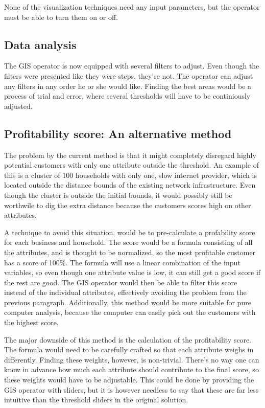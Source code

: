 \documentclass[twocolumn]{article}
\begin{document}
None of the visualization techniques need any input parameters, but the operator must be able to turn them on or off.

\subsection{Data analysis}
\label{sub:Data analysis}
The GIS operator is now equipped with several filters to adjust. Even though the filters were presented like they were steps, they're not. The operator can adjust any filters in any order he or she would like. Finding the best areas would be a process of trial and error, where several thresholds will have to be continiously adjusted.

\subsection{Profitability score: An alternative method}
\label{sub:Profitability score: An alternate method}
The problem by the current method is that it might completely disregard highly potential customers with only one attribute outside the threshold. An example of this is a cluster of 100 households with only one, slow internet provider, which is located outside the distance bounds of the existing network infrastructure. Even though the cluster is outside the initial bounds, it would possibly still be worthwile to dig the extra distance because the customers scores high on other attributes.

A technique to avoid this situation, would be to pre-calculate a profability score for each business and household. The score would be a formula consisting of all the attributes, and is thought to be normalized, so the most profitable customer has a score of 100\%. The formula will use a linear combination of the input variables, so even though one attribute value is low, it can still get a good score if the rest are good. The GIS operator would then be able to filter this score instead of the individual attributes, effectively avoiding the problem from the previous paragraph. Additionally, this method would be more suitable for pure computer analysis, because the computer can easily pick out the customers with the highest score.

The major downside of this method is the calculation of the profitability score. The formula would need to be carefully crafted so that each attribute weighs in differently. Finding these weights, however, is non-trivial. There's no way one can know in advance how much each attribute should contribute to the final score, so these weights would have to be adjustable. This could be done by providing the GIS operator with sliders, but it is however needless to say that these are far less intuitive than the threshold sliders in the original solution.
\end{document}
